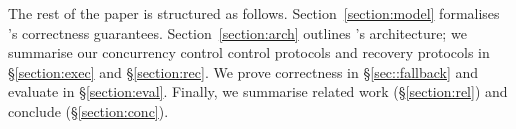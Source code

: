 The rest of the paper is structured as follows. Section~\ref{section:model} formalises \sys{}'s correctness guarantees.
Section~\ref{section:arch} outlines
\sys's architecture; we summarise our concurrency control control protocols and recovery protocols in \S\ref{section:exec} and \S\ref{section:rec}. We
prove correctness in \S\ref{sec::fallback} and evaluate \sys in \S\ref{section:eval}. Finally, we summarise related work (\S\ref{section:rel}) and conclude (\S\ref{section:conc}).


